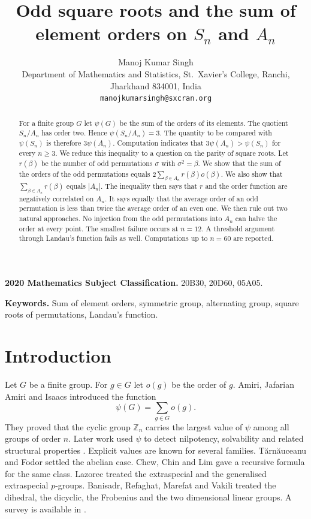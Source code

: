 \documentclass[10pt]{article}
\title{Odd square roots and the sum of element orders on $S_n$ and $A_n$}
\author{Manoj Kumar Singh\\
\small Department of Mathematics and Statistics, St.~Xavier's College, Ranchi,\\
\small Jharkhand 834001, India\\
\small \texttt{manojkumarsingh@sxcran.org}}
\date{}
\begin{document}
\maketitle

\begin{abstract}
For a finite group $G$ let $\psi(G)$ be the sum of the orders of its elements. The quotient
$S_n/A_n$ has order two. Hence $\psi(S_n/A_n)=3$. The quantity to be compared with
$\psi(S_n)$ is therefore $3\psi(A_n)$. Computation indicates that $3\psi(A_n)>\psi(S_n)$
for every $n\ge3$. We reduce this inequality to a question on the parity of square roots.
Let $r(\beta)$ be the number of odd permutations $\sigma$ with $\sigma^{2}=\beta$. We show
that the sum of the orders of the odd permutations equals
$2\sum_{\beta\in A_n}r(\beta)o(\beta)$. We also show that $\sum_{\beta\in A_n}r(\beta)$
equals $|A_n|$. The inequality then says that $r$ and the order function are negatively
correlated on $A_n$. It says equally that the average order of an odd permutation is less
than twice the average order of an even one. We then rule out two natural approaches. No
injection from the odd permutations into $A_n$ can halve the order at every point. The
smallest failure occurs at $n=12$. A threshold argument through Landau's function fails as
well. Computations up to $n=60$ are reported.
\end{abstract}

\noindent
\textbf{2020 Mathematics Subject Classification.} 20B30, 20D60, 05A05.

\medskip\noindent
\textbf{Keywords.} Sum of element orders, symmetric group, alternating group, square roots
of permutations, Landau's function.

\section{Introduction}\label{sec:intro}

Let $G$ be a finite group. For $g\in G$ let $o(g)$ be the order of $g$. Amiri, Jafarian
Amiri and Isaacs \cite{AAI2009} introduced the function
\begin{equation}\label{eq:psidef}
  \psi(G)=\sum_{g\in G}o(g).
\end{equation}
They proved that the cyclic group $\mathbb{Z}_n$ carries the largest value of $\psi$ among
all groups of order $n$. Later work used $\psi$ to detect nilpotency, solvability and
related structural properties \cite{AA2011,BaniasadKhosravi2018,Herzog2018,Tarnauceanu2020}.
Explicit values are known for several families. T\u{a}rn\u{a}uceanu and Fodor \cite{TF2014}
settled the abelian case. Chew, Chin and Lim \cite{CCL2017} gave a recursive formula for the
same class. Lazorec \cite{Lazorec2024} treated the extraspecial and the generalised
extraspecial $p$-groups. Banisadr, Refaghat, Marefat and Vakili \cite{BRMV2025} treated the
dihedral, the dicyclic, the Frobenius and the two dimensional linear groups. A survey is
available in \cite{Herzog2023}.
\end{document}
